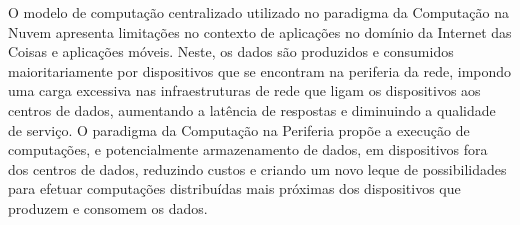 


O modelo de computação centralizado utilizado no paradigma da Computação na Nuvem apresenta limitações no contexto de aplicações no domínio da Internet das Coisas e aplicações móveis. Neste, os dados são produzidos e consumidos maioritariamente por dispositivos que se encontram na periferia da rede, impondo uma carga excessiva nas infraestruturas de rede que ligam os dispositivos aos centros de dados, aumentando a latência de respostas e diminuindo a qualidade de serviço. O paradigma da Computação na Periferia propõe a execução de computações, e potencialmente armazenamento de dados, em dispositivos fora dos centros de dados, reduzindo custos e criando um novo leque de possibilidades para efetuar computações distribuídas mais próximas dos dispositivos que produzem e consomem os dados.

